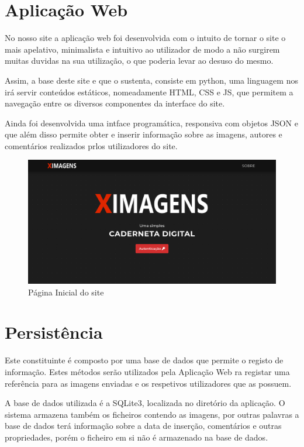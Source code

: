 \documentclass{report}
\begin{document}
\chapter{Aplicação Web}
No nosso site a aplicação web foi desenvolvida com o intuito de tornar o site o mais apelativo, minimalista e intuitivo ao utilizador de modo a não surgirem muitas duvidas na sua utilização, o que poderia levar ao desuso do mesmo. 

Assim, a base deste site e que o sustenta, consiste em python, uma linguagem nos irá servir conteúdos estáticos, nomeadamente HTML, CSS e JS, que permitem a navegação entre os diversos componentes da interface do site.

Ainda foi desenvolvida uma intface programática, responsiva com objetos JSON e que além disso permite obter e inserir informação sobre as imagens, autores e comentários realizados prlos utilizadores do site.

\begin{figure}[H]
    \centering
    \includegraphics[width=\textwidth]{unknown.png}
    \caption{Página Inicial do site}
\end{figure}


\chapter{Persistência}
Este constituinte é composto por uma base de dados que permite o registo de informação. Estes métodos serão utilizados pela Aplicação Web ra registar uma referência para as imagens enviadas e os respetivos utilizadores que as possuem. 

A base de dados utilizada é a SQLite3, localizada no diretório da aplicação. O sistema armazena também  os ficheiros contendo as imagens, por outras palavras a base de dados terá informação sobre a data de inserção, comentários e outras propriedades, porém o ficheiro em si não é armazenado na base de dados.
\end{document}
